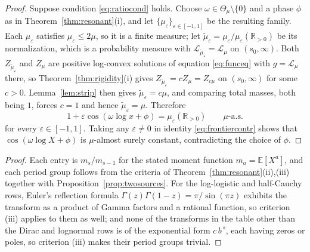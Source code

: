 \documentclass[sn-mathphys-num]{sn-jnl}
\theoremstyle{thmstyleone}%
\theoremstyle{thmstyletwo}%
\theoremstyle{thmstylethree}%
\theoremstyle{thmstyleone}%
\providecommand{\E}{\mathbb{E}}
\providecommand{\Rpos}{\mathbb{R}_{>0}}
\providecommand{\Leh}{\mathscr{L}}
\begin{document}
\begin{appendices}
		\begin{proof}
			Suppose condition \eqref{eq:ratiocond} holds. Choose
			$\omega\in\Theta_\mu\setminus\{0\}$ and a phase $\phi$ as in
			Theorem~\ref{thm:resonant}(i), and let
			$\{\mu_\varepsilon\}_{\varepsilon\in[-1,1]}$ be the resulting
			family. Each $\mu_\varepsilon$ satisfies
			$\mu_\varepsilon\le2\mu$, so it is a finite measure; let
			$\widetilde\mu_\varepsilon
			=\mu_\varepsilon/\mu_\varepsilon(\Rpos)$ be its normalization,
			which is a probability measure with
			$\Leh_{\widetilde\mu_\varepsilon}=\Leh_\mu$ on $(s_0,\infty)$.
			Both $Z_{\widetilde\mu_\varepsilon}$ and $Z_\mu$ are positive
			log-convex solutions of equation \eqref{eq:funceq} with
			$g=\Leh_\mu$ there, so Theorem~\ref{thm:rigidity}(i) gives
			$Z_{\widetilde\mu_\varepsilon}=cZ_\mu=Z_{c\mu}$ on $(s_0,\infty)$
			for some $c>0$. Lemma~\ref{lem:strip} then gives
			$\widetilde\mu_\varepsilon=c\mu$, and comparing total masses, both
			being $1$, forces $c=1$ and hence
			$\widetilde\mu_\varepsilon=\mu$. Therefore
			\begin{equation}\label{eq:frontiercontr}
				1+\varepsilon\cos(\omega\log x+\phi)
				=\mu_\varepsilon(\Rpos)\qquad\mu\text{-a.s.}
			\end{equation}
			for every $\varepsilon\in[-1,1]$. Taking any $\varepsilon\neq0$ in
			identity \eqref{eq:frontiercontr} shows that $\cos(\omega\log X+\phi)$ is
			$\mu$-almost surely constant, contradicting the choice of $\phi$.
		\end{proof}
		
		
		\propdictionary*
		
		\begin{proof}
			Each entry is $m_s/m_{s-1}$ for the stated moment function
			$m_a=\E[X^a]$, and each period group follows from the criteria
			of Theorem~\ref{thm:resonant}(ii),(iii) together with
			Proposition~\ref{prop:twosources}. For the log-logistic and
			half-Cauchy rows, Euler's reflection formula
			$\Gamma(z)\Gamma(1-z)=\pi/\sin(\pi z)$ exhibits the
			transform as a product of Gamma factors and a rational
			function, so criterion (iii) applies to them as well; and none
			of the transforms in the table other than the Dirac and
			lognormal rows is of the exponential form $c\,b^{\,s}$,
			each having zeros or poles, so criterion (iii) makes their
			period groups trivial.
			

\end{proof}
\end{appendices}
\end{document}

